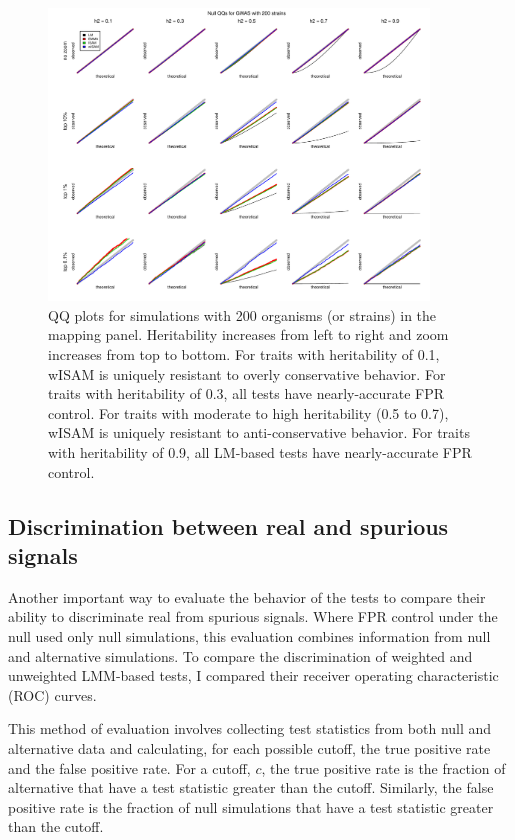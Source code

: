 \begin{figure}
  \centering
  \includegraphics[width = 0.9\textwidth]{images/2018-05-19alt_heterosked_sims_nstrain=200_nsnps=100_nsims=10000.pdf}
  \caption[
    QQ plots for simulations with 200 organisms in the mapping panel.
  ]{
    QQ plots for simulations with 200 organisms (or strains) in the mapping panel.
    Heritability increases from left to right and zoom increases from top to bottom.
    For traits with heritability of 0.1, wISAM is uniquely resistant to overly conservative behavior.
    For traits with heritability of 0.3, all tests have nearly-accurate FPR control.
    For traits with moderate to high heritability (0.5 to 0.7), wISAM is uniquely resistant to anti-conservative behavior.
    For traits with heritability of 0.9, all LM-based tests have nearly-accurate FPR control.
  }
  \label{fig:qqmegaplot3}
\end{figure}


\subsection{Discrimination between real and spurious signals}

Another important way to evaluate the behavior of the tests to compare their ability to discriminate real from spurious signals.
Where FPR control under the null used only null simulations, this evaluation combines information from null and alternative simulations.
To compare the discrimination of weighted and unweighted LMM-based tests, I compared their receiver operating characteristic (ROC) curves.

This method of evaluation involves collecting test statistics from both null and alternative data and calculating, for each possible cutoff, the true positive rate and the false positive rate.
For a cutoff, $c$, the true positive rate is the fraction of alternative that have a test statistic greater than the cutoff.
Similarly, the false positive rate is the fraction of null simulations that have a test statistic greater than the cutoff.

